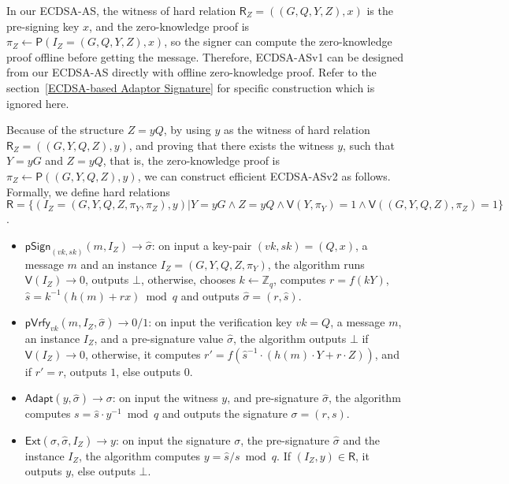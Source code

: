 \documentclass{llncs}
\begin{document}
In our ECDSA-AS, the witness of hard relation $\mathsf{R}_Z=((G, Q, Y, Z), x)$ is the pre-signing key $x$, and the zero-knowledge proof is $\pi_Z\leftarrow \mathsf{P}(I_Z=(G, Q, Y, Z), x)$, so the signer can compute the zero-knowledge proof offline before getting the message. Therefore, ECDSA-ASv1 can be designed from our ECDSA-AS directly with offline zero-knowledge proof. Refer to the section~\ref{ECDSA-based Adaptor Signature} for specific construction which is ignored here.



Because of the structure $Z=yQ$, by using $y$ as the witness of hard relation $\mathsf{R}_Z=((G,Y,Q,Z),y)$, and proving that there exists the witness $y$, such that $Y=yG$ and $Z=yQ$, that is, the zero-knowledge proof is $\pi_Z\leftarrow \mathsf{P}((G,Y,Q,Z),y)$, we can construct efficient ECDSA-ASv2 as follows. Formally, we define hard relations $\mathsf{R}=\{(I_Z=(G,Y,Q,Z,\pi_Y,\pi_Z), y) | Y = yG \wedge Z=yQ \wedge \mathsf{V}(Y,\pi_Y) = 1\wedge \mathsf{V}((G,Y,Q,Z),\pi_Z) = 1\}$. 

\begin{itemize}
\item $\mathsf{pSign}_{(vk,sk)}(m,I_Z)\rightarrow \hat{\sigma}$: on input a key-pair $(vk,sk)=(Q,x)$, a message $m$ and an instance $I_Z=(G,Y,Q,Z,\pi_Y)$, the algorithm runs $\mathsf{V}(I_Z)\rightarrow 0$, outputs $\bot$, otherwise, chooses $k\leftarrow \mathbb{Z}_q$, computes $r=f(kY)$, $\hat{s}=k^{-1}(h(m)+rx) \bmod q$ and outputs $\hat{\sigma}=(r,\hat{s})$.

\item $\mathsf{pVrfy}_{vk}(m,I_Z,\hat{\sigma})\rightarrow 0/1$: on input the verification key $vk=Q$, a message $m$, an instance $I_Z$, and a pre-signature value $\hat{\sigma}$, the algorithm outputs $\bot$ if $\mathsf{V}(I_{Z})\rightarrow 0$, otherwise, it computes $r'=f(\hat{s}^{-1}\cdot (h(m)\cdot Y+r\cdot Z))$, and if $r'=r$, outputs $1$, else outputs $0$.

\item $\mathsf{Adapt}(y,\hat{\sigma})\rightarrow \sigma$: on input the witness $y$, and pre-signature $\hat{\sigma}$, the algorithm computes $s=\hat{s}\cdot y^{-1} \bmod q$ and outputs the signature $\sigma=(r,s)$.

\item $\mathsf{Ext}(\sigma,\hat{\sigma},I_Z)\rightarrow y$: on input the signature $\sigma$, the pre-signature $\hat{\sigma}$ and the instance $I_Z$, the algorithm computes $y=\hat{s}/s \bmod q$. If $(I_Z, y)\in \mathsf{R}$, it outputs $y$, else outputs $\bot$.
\end{itemize}
\end{document}
